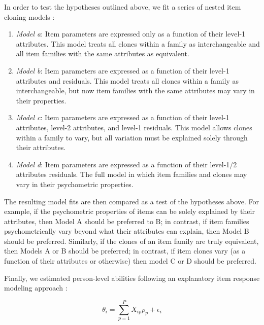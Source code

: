 \documentclass[a4paper,man,natbib]{apa6}
\begin{document}
In order to test the hypotheses outlined above, we fit a series of nested item cloning models \citep{cho2014additive, lathrop2017item}: 

\begin{enumerate}

\item \textit{Model a}: Item parameters are expressed only as a function of their level-1 attributes. This model treats all clones within a family as interchangeable and all item families with the same attributes as equivalent. 

\item \textit{Model b}: Item parameters are expressed as a function of their level-1 attributes and residuals. This model treats all clones within a family as interchangeable, but now item families with the same attributes may vary in their properties. 

\item \textit{Model c}: Item parameters are expressed as a function of their level-1 attributes, level-2 attributes, and level-1 residuals. This model allows clones within a family to vary, but all variation must be explained solely through their attributes.  

\item \textit{Model d}: Item parameters are expressed as a function of their level-1/2 attributes residuals. The full model in which item families and clones may vary in their psychometric properties. 

\end{enumerate}

The resulting model fits are then compared as a test of the hypotheses above. For example, if the psychometric properties of items can be solely explained by their attributes, then Model A should be preferred to B; in contrast, if item families psychometrically vary beyond what their attributes can explain, then Model B should be preferred. Similarly, if the clones of an item family are truly equivalent, then Models A or B should be preferred; in contrast, if item clones vary (as a function of their attributes or otherwise) then model C or D should be preferred. 

Finally, we estimated person-level abilities following an explanatory item response modeling approach \citep{wilson2008explanatory}:   

\begin{equation} \label{eq:4}
\theta_i = \sum_{p=1}^P X_{ip} \rho_p + \epsilon_i    
\end{equation}
\end{document}

